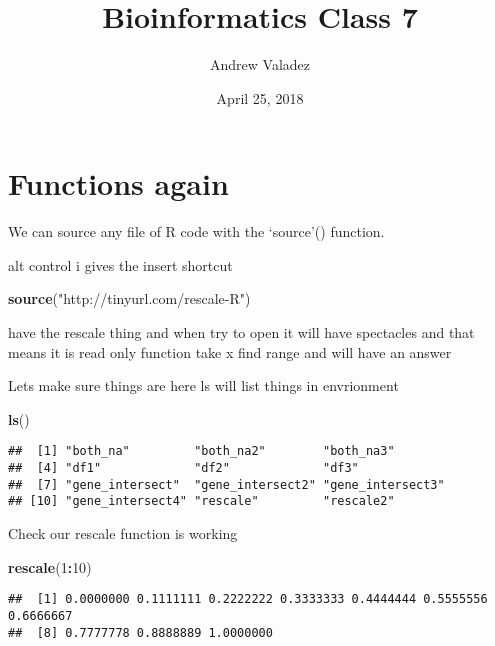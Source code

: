 \documentclass[]{article}
\title{Bioinformatics Class 7}
\author{Andrew Valadez}
\date{April 25, 2018}
\newenvironment{Shaded}{\begin{snugshade}}{\end{snugshade}}
\newcommand{\KeywordTok}[1]{\textcolor[rgb]{0.13,0.29,0.53}{\textbf{#1}}}
\newcommand{\DecValTok}[1]{\textcolor[rgb]{0.00,0.00,0.81}{#1}}
\newcommand{\StringTok}[1]{\textcolor[rgb]{0.31,0.60,0.02}{#1}}
\newcommand{\OperatorTok}[1]{\textcolor[rgb]{0.81,0.36,0.00}{\textbf{#1}}}
\newcommand{\NormalTok}[1]{#1}
\begin{document}
\maketitle

\section{Functions again}\label{functions-again}

We can source any file of R code with the `source'() function.

alt control i gives the insert shortcut

\begin{Shaded}
\begin{Highlighting}[]
\KeywordTok{source}\NormalTok{(}\StringTok{"http://tinyurl.com/rescale-R"}\NormalTok{)}
\end{Highlighting}
\end{Shaded}

have the rescale thing and when try to open it will have spectacles and
that means it is read only function take x find range and will have an
answer

Lets make sure things are here ls will list things in envrionment

\begin{Shaded}
\begin{Highlighting}[]
\KeywordTok{ls}\NormalTok{()}
\end{Highlighting}
\end{Shaded}

\begin{verbatim}
##  [1] "both_na"         "both_na2"        "both_na3"       
##  [4] "df1"             "df2"             "df3"            
##  [7] "gene_intersect"  "gene_intersect2" "gene_intersect3"
## [10] "gene_intersect4" "rescale"         "rescale2"
\end{verbatim}

Check our rescale function is working

\begin{Shaded}
\begin{Highlighting}[]
\KeywordTok{rescale}\NormalTok{(}\DecValTok{1}\OperatorTok{:}\DecValTok{10}\NormalTok{)}
\end{Highlighting}
\end{Shaded}

\begin{verbatim}
##  [1] 0.0000000 0.1111111 0.2222222 0.3333333 0.4444444 0.5555556 0.6666667
##  [8] 0.7777778 0.8888889 1.0000000
\end{verbatim}
\end{document}
